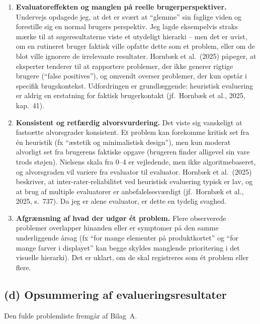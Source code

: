 \documentclass[12pt,a4paper]{article}
\begin{document}
\begin{enumerate}[leftmargin=*,itemsep=0.4em]

  \item \textbf{Evaluatoreffekten og manglen på reelle brugerperspektiver.}
        Undervejs opdagede jeg, at det er svært at ``glemme'' sin faglige viden og forestille sig
        en normal brugers perspektiv. Jeg lagde eksempelvis straks mærke til at søgeresultaterne viste et utydeligt hierarki -- men det er uvist, om en rutineret bruger faktisk ville
        opfatte dette som et problem, eller om de blot ville ignorere de irrelevante resultater.
        Hornbæk et al.\ (2025) påpeger, at eksperter tenderer til at rapportere problemer, der
        ikke generer rigtige brugere (``false positives''), og omvendt overser problemer, der kun
        opstår i specifik brugskontekst. Udfordringen er grundlæggende: heuristisk evaluering er
        aldrig en erstatning for faktisk brugerkontakt (jf.\ Hornbæk et al., 2025, kap.\ 41).

  \item \textbf{Konsistent og retfærdig alvorsvurdering.}
        Det viste sig vanskeligt at fastsætte alvorsgrader konsistent. Et problem kan forekomme
        kritisk set fra én heuristik (fx ``æstetik og minimalistisk design''), men kun moderat
        alvorligt set fra brugerens faktiske opgave (brugeren finder alligevel sin vare trods
        støjen). Nielsens skala fra 0--4 er vejledende, men ikke algoritme\-baseret, og
        alvors\-graden vil variere fra evaluator til evaluator. Hornbæk et al.\ (2025) beskriver,
        at inter-rater-reliabilitet ved heuristisk evaluering typisk er lav, og at brug af
        multiple evaluatorer er anbefalelsesværdigt (jf.\ Hornbæk et al., 2025, s.\ 737). Da jeg er alene evaluator, er dette en
        tydelig svaghed.

  \item \textbf{Afgrænsning af hvad der udgør ét problem.}
        Flere observerede problemer overlapper hinanden eller er symptomer på den samme
        underliggende årsag (fx ``for mange elementer på produktkortet'' og ``for mange farver i
        displayet'' kan begge skyldes manglende prioritering i det visuelle hierarki). Det er
        uklart, om de skal registreres som ét problem eller flere.

\end{enumerate}

\subsection*{(d) Opsummering af evalueringsresultater}
Den fulde problemliste fremgår af Bilag~A.
\end{document}
